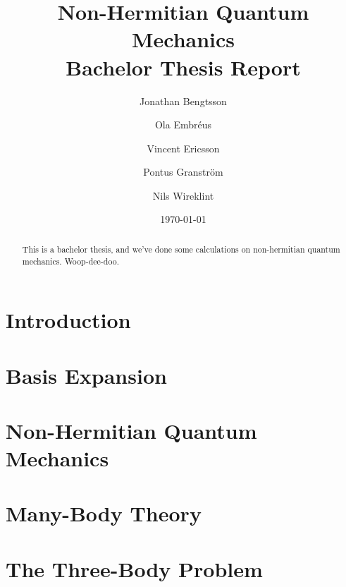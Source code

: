 \documentclass[12pt,a4paper]{report}
\begin{document}
  

\listoftodos

\title{Non-Hermitian Quantum Mechanics\\ 
\Large Bachelor Thesis Report}
\author{Jonathan Bengtsson  \and Ola Embréus \and Vincent Ericsson \and Pontus Granström \and Nils Wireklint}
\date{\today}



\maketitle

\newpage
\begin{abstract}
This is a bachelor thesis, and we've done some calculations on non-hermitian quantum mechanics. Woop-dee-doo.
\end{abstract}
\newpage

\tableofcontents


\newpage

\setcounter{page}{1}

\chapter{Introduction}
\label{cha:introduction}



\chapter{Basis Expansion}
\label{cha:basis_expansion}


\chapter{Non-Hermitian Quantum Mechanics} 
\label{cha:nhqm}



\chapter{Many-Body Theory}
\label{cha:many_body}




\chapter{The Three-Body Problem}
\label{cha:three_body}
\end{document}
